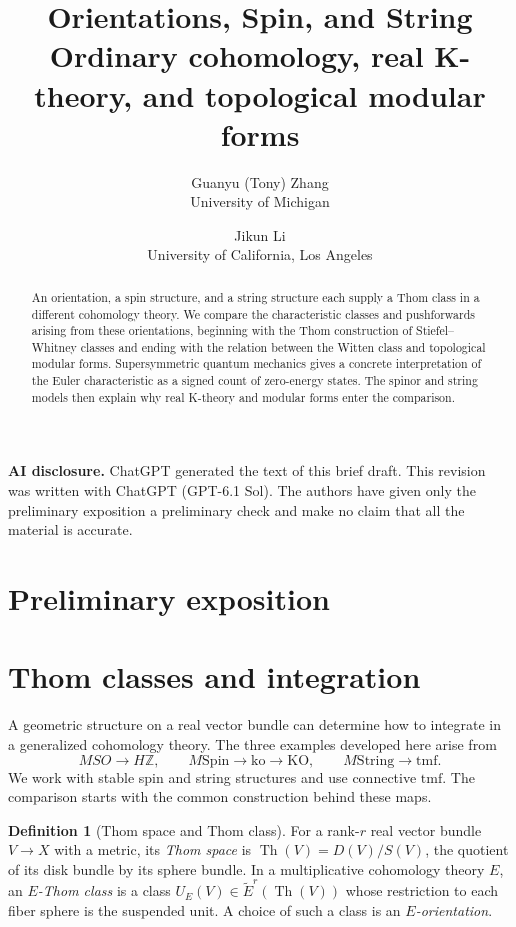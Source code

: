 \documentclass[11pt]{article}
\title{{\fontsize{18}{22}\selectfont Orientations, Spin, and String}\\[4pt]
  {\fontsize{11}{14}\selectfont Ordinary cohomology, real K-theory, and topological modular forms}}
\author{Guanyu (Tony) Zhang\\{\small University of Michigan}
  \and Jikun Li\\{\small University of California, Los Angeles}}
\date{}
\theoremstyle{definition}
\newtheorem{defn}{Definition}[section]
\newcommand{\Th}{\operatorname{Th}}
\newcommand{\KO}{\mathrm{KO}}
\newcommand{\tmf}{\mathrm{tmf}}
\newcommand{\ko}{\mathrm{ko}}
\newcommand{\Z}{\mathbb Z}
\newcommand{\Spin}{\mathrm{Spin}}
\newcommand{\String}{\mathrm{String}}
\begin{document}
\maketitle
\begin{abstract}
An orientation, a spin structure, and a string structure each supply a Thom class in a different cohomology theory. We compare the characteristic classes and pushforwards arising from these orientations, beginning with the Thom construction of Stiefel--Whitney classes and ending with the relation between the Witten class and topological modular forms. Supersymmetric quantum mechanics gives a concrete interpretation of the Euler characteristic as a signed count of zero-energy states. The spinor and string models then explain why real K-theory and modular forms enter the comparison.
\end{abstract}

\noindent\textbf{AI disclosure.}
ChatGPT generated the text of this brief draft. This revision was written with ChatGPT (GPT-6.1 Sol). The authors have given only the preliminary exposition a preliminary check and make no claim that all the material is accurate.

\section*{Preliminary exposition}

\section{Thom classes and integration}
A geometric structure on a real vector bundle can determine how to integrate in a generalized cohomology theory. The three examples developed here arise from
\[
 MSO\longrightarrow H\Z,\qquad M\Spin\longrightarrow\ko\longrightarrow\KO,
 \qquad M\String\longrightarrow\tmf.
\]
We work with stable spin and string structures and use connective \(\tmf\). The comparison starts with the common construction behind these maps.

\begin{defn}[Thom space and Thom class]
For a rank-\(r\) real vector bundle \(V\to X\) with a metric, its \emph{Thom space} is \(\Th(V)=D(V)/S(V)\), the quotient of its disk bundle by its sphere bundle. In a multiplicative cohomology theory \(E\), an \emph{\(E\)-Thom class} is a class \(U_E(V)\in\widetilde E^r(\Th(V))\) whose restriction to each fiber sphere is the suspended unit. A choice of such a class is an \emph{\(E\)-orientation}.
\end{defn}
\end{document}
